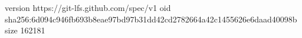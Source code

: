 version https://git-lfs.github.com/spec/v1
oid sha256:6d094c946fb693b8eae97bd97b31dd42cd2782664a42c1455626e6daad40098b
size 162181
